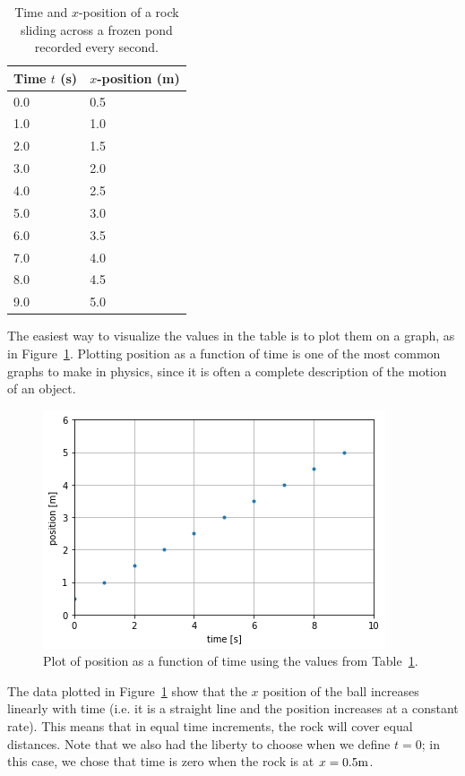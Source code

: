 \documentclass[9pt,arxiv,red]{lapreprint}
\begin{document}
\begin{table}
\centering
\caption[]{Time and $x$-position of a rock sliding across a frozen pond recorded every second.}
\label{tab:MomentumAndCM:1dmotion}
\begin{tabular}{p{}p{}}
\toprule
Time $t$ (s) & $x$-position (m) \\
\hline
0.0 & 0.5 \\
1.0 & 1.0 \\
2.0 & 1.5 \\
3.0 & 2.0 \\
4.0 & 2.5 \\
5.0 & 3.0 \\
6.0 & 3.5 \\
7.0 & 4.0 \\
8.0 & 4.5 \\
9.0 & 5.0 \\
\bottomrule
\end{tabular}
\end{table}

The easiest way to visualize the values in the table is to plot them on a graph, as in Figure~\ref{fig:MomentumAndCM:1dxvst}. Plotting position as a function of time is one of the most common graphs to make in physics, since it is often a complete description of the motion of an object.

\begin{figure}[!htbp]
\centering
\includegraphics[width=0.7\linewidth]{files/1dxvst-d6543db2884dccdda7dabba7850de246.png}
\caption[]{Plot of position as a function of time using the values from Table~\ref{tab:MomentumAndCM:1dmotion}.}
\label{fig:MomentumAndCM:1dxvst}
\end{figure}

The data plotted in Figure~\ref{fig:MomentumAndCM:1dxvst} show that the $x$ position of the ball increases linearly with time (i.e. it is a straight line and the position increases at a constant rate). This means that in equal time increments, the rock will cover equal distances. Note that we also had the liberty to choose when we define $t=0$; in this case, we chose that time is zero when the rock is at $x=0.5 {\rm m}$.
\end{document}
